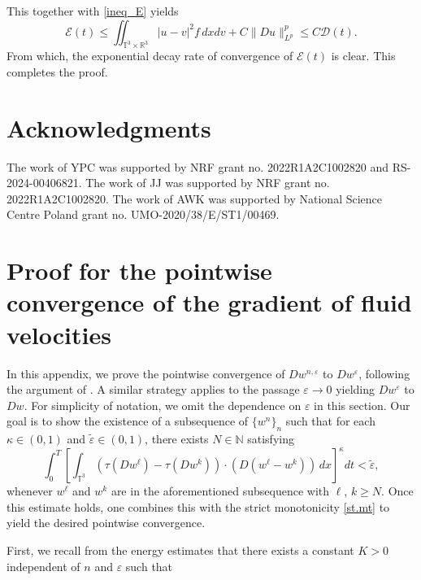 \documentclass[10pt,reqno]{amsart}
\numberwithin{equation}{section}
\newcommand{\R}{\mathbb R}
\newcommand{\N}{\mathbb N}
\newcommand{\T}{\mathbb T}
\newcommand{\bq}{\begin{equation}}
\newcommand{\eq}{\end{equation}}
\newcommand{\e}{\varepsilon}
\newcommand{\te}{\tilde\varepsilon}
\newcommand{\lt}{\left}
\newcommand{\rt}{\right}
\newcommand{\calE}{\mathcal{E}}
\newcommand{\calD}{\mathcal{D}}
\newcommand{\intt}{\int_{\T^3}}
\newcommand{\inttr}{\iint_{\T^3 \times \R^3}}
\begin{document}
 
This together with \eqref{ineq_E} yields
\[
\calE(t) \leq \inttr |u-v|^2 f\,dxdv + C\|Du\|_{L^p}^p \leq C\calD(t).
\]
From which, the exponential decay rate of convergence of $\calE(t)$ is clear.  This completes the proof.


%
%
%
%

\section*{Acknowledgments}
The work of YPC was supported by NRF grant no. 2022R1A2C1002820 and RS-2024-00406821. The work of JJ was supported by NRF grant no. 2022R1A2C1002820. The work of AWK was supported by National Science Centre Poland grant no. UMO-2020/38/E/ST1/00469.

%
%
%
%
\appendix


\section{Proof for the pointwise convergence of the gradient of fluid velocities}\label{app.A}
\setcounter{equation}{0}
In this appendix, we prove the pointwise convergence of $Dw^{n,\e}$ to $Dw^\e$, following the argument of \cite{FMS97}. A similar strategy applies to the passage $\e \to 0$ yielding $Dw^\e$ to $Dw$. For simplicity of notation, we omit the dependence on $\e$ in this section. Our goal is to show the existence of a subsequence of $\{w^n\}_n$ such that for each $\kappa\in(0,1)$ and $\te\in (0,1)$, there exists $N \in \N$ satisfying
\[%
\int_0^T \lt[\intt (\tau (Dw^\ell) - \tau(Dw^k))\cdot (D(w^\ell - w^k))\,dx \rt]^\kappa dt  < \te,
\]%
whenever $w^\ell$ and $w^k$ are in the aforementioned subsequence  with $\ell$, $k \ge N$. Once this estimate holds, one combines this with the strict monotonicity \eqref{st.mt} to yield the desired pointwise convergence.

 First, we recall from the energy estimates that there exists a constant $K>0$ independent of $n$ and $\e$ such that
 
\end{document}
